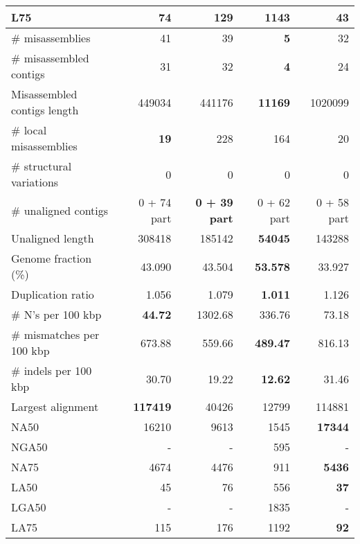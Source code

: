 \documentclass[12pt,a4paper]{article}
\begin{document}
\begin{table}[ht]
\begin{center}
\begin{tabular}{|l*{4}{|r}|}
L75 & 74 & 129 & 1143 & {\bf 43} \\ \hline
\# misassemblies & 41 & 39 & {\bf 5} & 32 \\ \hline
\# misassembled contigs & 31 & 32 & {\bf 4} & 24 \\ \hline
Misassembled contigs length & 449034 & 441176 & {\bf 11169} & 1020099 \\ \hline
\# local misassemblies & {\bf 19} & 228 & 164 & 20 \\ \hline
\# structural variations & 0 & 0 & 0 & 0 \\ \hline
\# unaligned contigs & 0 + 74 part & {\bf 0 + 39 part} & 0 + 62 part & 0 + 58 part \\ \hline
Unaligned length & 308418 & 185142 & {\bf 54045} & 143288 \\ \hline
Genome fraction (\%) & 43.090 & 43.504 & {\bf 53.578} & 33.927 \\ \hline
Duplication ratio & 1.056 & 1.079 & {\bf 1.011} & 1.126 \\ \hline
\# N's per 100 kbp & {\bf 44.72} & 1302.68 & 336.76 & 73.18 \\ \hline
\# mismatches per 100 kbp & 673.88 & 559.66 & {\bf 489.47} & 816.13 \\ \hline
\# indels per 100 kbp & 30.70 & 19.22 & {\bf 12.62} & 31.46 \\ \hline
Largest alignment & {\bf 117419} & 40426 & 12799 & 114881 \\ \hline
NA50 & 16210 & 9613 & 1545 & {\bf 17344} \\ \hline
NGA50 & - & - & 595 & - \\ \hline
NA75 & 4674 & 4476 & 911 & {\bf 5436} \\ \hline
LA50 & 45 & 76 & 556 & {\bf 37} \\ \hline
LGA50 & - & - & 1835 & - \\ \hline
LA75 & 115 & 176 & 1192 & {\bf 92} \\ \hline
\end{tabular}
\end{center}
\end{table}
\end{document}
